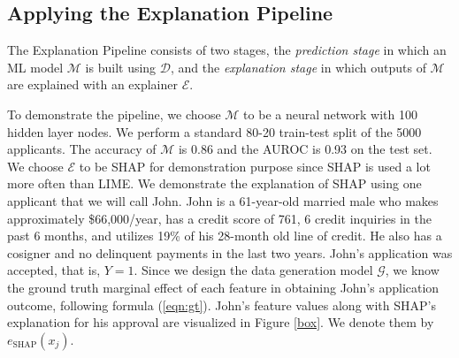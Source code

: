 \documentclass[12pt]{article}  %
\begin{document}
\subsection{Applying the Explanation Pipeline}
\label{sec:applying_to_simulated}
The Explanation Pipeline consists of two stages, the \emph{prediction stage} in which an ML model $\mathcal{M}$ is built using $\mathcal{D}$, and the \emph{explanation stage} in which outputs of $\mathcal{M}$ are explained with an explainer $\mathcal{E}$. 

To demonstrate the pipeline, we choose $\mathcal{M}$ to be a neural network with 100 hidden layer nodes. We perform a standard 80-20 train-test split of the 5000 applicants. The accuracy of $\mathcal{M}$ is 0.86 and the AUROC is 0.93 on the test set. We choose $\mathcal{E}$ to be SHAP for demonstration purpose since SHAP is used a lot more often than LIME. %
We demonstrate the explanation of SHAP using one applicant that we will call John. John is a 61-year-old married male who makes approximately \$66,000/year, has a credit score of 761, 6 credit inquiries in the past 6 months, and utilizes 19\% of his 28-month old line of credit. He also has a cosigner and no delinquent payments in the last two years. John's application was accepted, that is, $Y = 1$. Since we design the data generation model $\mathcal{G}$, we know the ground truth marginal effect of each feature in obtaining John's application outcome, following formula (\ref{eqn:gt}). John's feature values along with SHAP's explanation for his approval are visualized in Figure \ref{box}. We denote them by $e_\text{SHAP}(x_j)$. %
\end{document}
